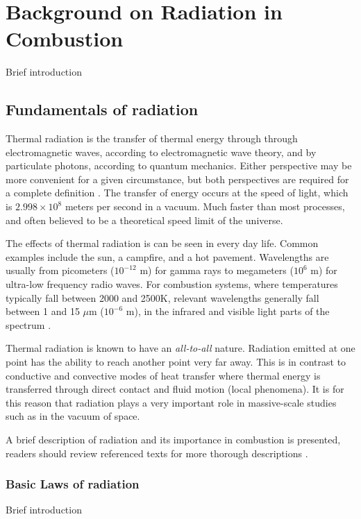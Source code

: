 \addchapheadtotoc
\chapter{Background on Radiation in Combustion}\label{chapter:Importance}
Brief introduction

\section{Fundamentals of radiation} \label{Sec:FundOfRad}
Thermal radiation is the transfer of thermal energy through through electromagnetic waves, according to electromagnetic wave theory, and by particulate photons, according to quantum mechanics. 
Either perspective may be more convenient for a given circumstance, but both perspectives are required for a complete definition \cite{Modest2013RadiativeTransfer}. The transfer of energy occurs at the speed of light, which is $2.998 \times 10^8$ meters per second in a vacuum.
Much faster than most processes, and often believed to be a theoretical speed limit of the universe.

The effects of thermal radiation is can be seen in every day life. Common examples include the sun, a campfire, and a hot pavement. 
Wavelengths are usually from picometers ($10^{-12}$ m) for gamma rays to megameters ($10^6$ m) for ultra-low frequency radio waves.
For combustion systems, where temperatures typically fall between 2000 and 2500K, relevant wavelengths generally fall between 1 and 15 $\mu{}$m ($10^{-6}$ m), in the infrared and visible light parts of the spectrum \cite{Liu2020TheFlames}.

Thermal radiation is known to have an \textit{all-to-all} nature. Radiation emitted at one point has the ability to reach another point very far away. 
This is in contrast to conductive and convective modes of heat transfer where thermal energy is transferred through direct contact and fluid motion (local phenomena). 
It is for this reason that radiation plays a very important role in massive-scale studies such as in the vacuum of space.

A brief description of radiation and its importance in combustion is presented,
readers should review referenced texts for more thorough descriptions \cite{Howell2010ThermalTransfer,Modest2013RadiativeTransfer}.

\subsection{Basic Laws of radiation}
Brief introduction

